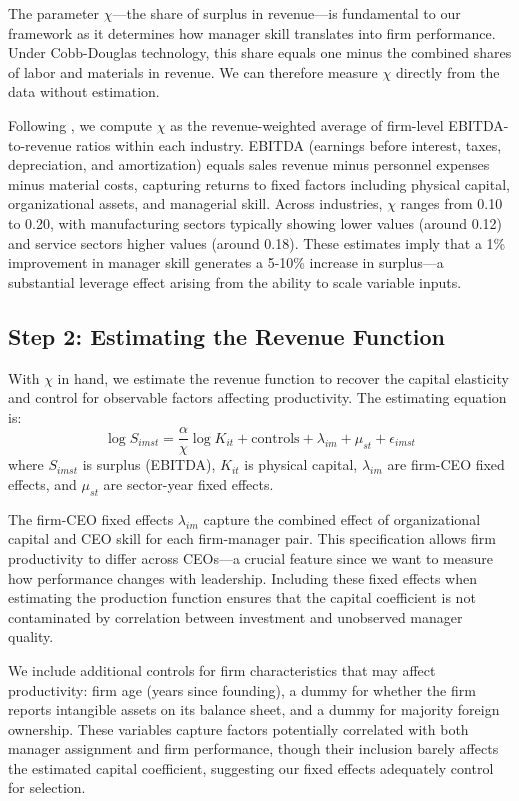 \documentclass[11pt,a4paper]{article}
\begin{document}
The parameter $\chi$—the share of surplus in revenue—is fundamental to our framework as it determines how manager skill translates into firm performance. Under Cobb-Douglas technology, this share equals one minus the combined shares of labor and materials in revenue. We can therefore measure $\chi$ directly from the data without estimation.

Following \citet{Gandhi2020-nu}, we compute $\chi$ as the revenue-weighted average of firm-level EBITDA-to-revenue ratios within each industry. EBITDA (earnings before interest, taxes, depreciation, and amortization) equals sales revenue minus personnel expenses minus material costs, capturing returns to fixed factors including physical capital, organizational assets, and managerial skill. Across industries, $\chi$ ranges from 0.10 to 0.20, with manufacturing sectors typically showing lower values (around 0.12) and service sectors higher values (around 0.18). These estimates imply that a 1\% improvement in manager skill generates a 5-10\% increase in surplus—a substantial leverage effect arising from the ability to scale variable inputs.

\subsection{Step 2: Estimating the Revenue Function}

With $\chi$ in hand, we estimate the revenue function to recover the capital elasticity and control for observable factors affecting productivity. The estimating equation is:
\begin{equation}
\log S_{imst} = \frac{\alpha}{\chi} \log K_{it} + \text{controls} + \lambda_{im} + \mu_{st} + \epsilon_{imst}
\end{equation}
where $S_{imst}$ is surplus (EBITDA), $K_{it}$ is physical capital, $\lambda_{im}$ are firm-CEO fixed effects, and $\mu_{st}$ are sector-year fixed effects.

The firm-CEO fixed effects $\lambda_{im}$ capture the combined effect of organizational capital and CEO skill for each firm-manager pair. This specification allows firm productivity to differ across CEOs—a crucial feature since we want to measure how performance changes with leadership. Including these fixed effects when estimating the production function ensures that the capital coefficient is not contaminated by correlation between investment and unobserved manager quality.

We include additional controls for firm characteristics that may affect productivity: firm age (years since founding), a dummy for whether the firm reports intangible assets on its balance sheet, and a dummy for majority foreign ownership. These variables capture factors potentially correlated with both manager assignment and firm performance, though their inclusion barely affects the estimated capital coefficient, suggesting our fixed effects adequately control for selection.
\end{document}

